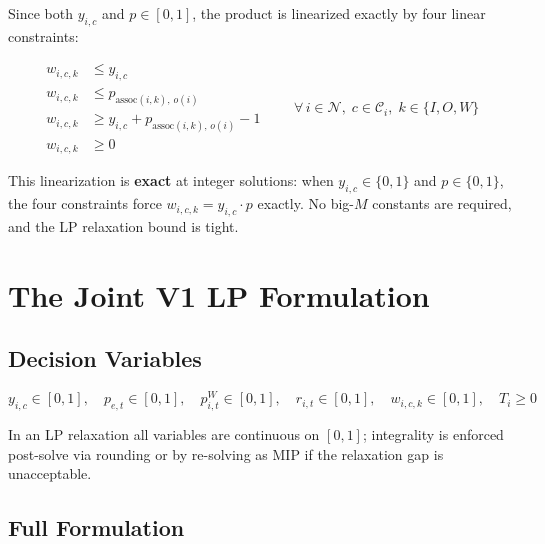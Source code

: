 \documentclass{article}
\begin{document}
Since both $y_{i,c}$ and $p \in [0,1]$, the product is linearized exactly by four
linear constraints:

\[
\begin{aligned}
  w_{i,c,k} &\leq y_{i,c} \\
  w_{i,c,k} &\leq p_{\text{assoc}(i,k),\, o(i)} \\
  w_{i,c,k} &\geq y_{i,c} + p_{\text{assoc}(i,k),\, o(i)} - 1 \\
  w_{i,c,k} &\geq 0
\end{aligned}
\qquad \forall\, i \in \mathcal{N},\; c \in \mathcal{C}_i,\; k \in \{I, O, W\}
\]

This linearization is \textbf{exact} at integer solutions: when $y_{i,c} \in \{0,1\}$ and
$p \in \{0,1\}$, the four constraints force $w_{i,c,k} = y_{i,c} \cdot p$ exactly.
No big-$M$ constants are required, and the LP relaxation bound is tight.

\section{The Joint V1 LP Formulation}

\subsection{Decision Variables}

\[
  y_{i,c} \in [0,1], \quad
  p_{e,t} \in [0,1], \quad
  p_{i,t}^W \in [0,1], \quad
  r_{i,t} \in [0,1], \quad
  w_{i,c,k} \in [0,1], \quad
  T_i \geq 0
\]

In an LP relaxation all variables are continuous on $[0,1]$; integrality is enforced
post-solve via rounding or by re-solving as MIP if the relaxation gap is unacceptable.

\subsection{Full Formulation}
\end{document}
